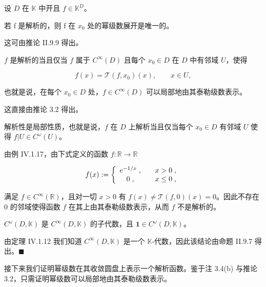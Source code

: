 \begin{remark}

设 $D$ 在 $\mathbb{K}$ 中开且 $f \in \mathbb{K}^D$。

\begin{items}
\item

若 f 是解析的，则 f 在 $x_0$ 处的幂级数展开是唯一的。

\proofhead
这可由推论 II.9.9 得出。
\item

$f$ 是解析的当且仅当 $f$ 属于 $C^\infty(D)$ 且每个 $x_0 \in D$ 在 $D$ 中有邻域 $U$，使得

\[
f(x)=\mathcal{T}(f,x_{0})(x),\qquad x\in U,
\]

也就是说，在每个 $ x_0 \in D $ 处，$ f \in C^\infty(D) $ 可以局部地由其泰勒级数表示。

\proofhead
这直接由推论 3.2 得出。
\item

解析性是局部性质，也就是说，$f$ 在 $D$ 上解析当且仅当每个 $x_0 \in D$ 有邻域 $U$ 使得 $f|U \in C^\omega(U)$。

\item

由例 IV.1.17，由下式定义的函数 $ f: \mathbb{R} \to \mathbb{R} $

\begin{equation*}
f(x):=\left\{\begin{array}{c l}{e^{-1/x}\;,}&{\quad x>0\;,}\\ {0\;,}&{\quad x\leq0\;,}\\ \end{array}\right.
\end{equation*}

满足 $ f \in C^\infty(\mathbb{R}) $，且对一切 $ x > 0 $ 有 $ f(x) \neq \mathcal{T}(f,0)(x) = 0 $。因此不存在 0 的邻域使得函数 $ f $ 在其上由其泰勒级数表示，从而 $ f $ 不是解析的。

\item

$ C^\omega(D,\mathbb{K}) $ 是 $ C^\infty(D,\mathbb{K}) $ 的子代数，且 $ \mathbf{1} \in C^\omega(D,\mathbb{K}) $。

\proofhead
由定理 IV.1.12 我们知道 $ C^\infty(D, \mathbb{K}) $ 是一个 $ \mathbb{K} $-代数，因此该结论由命题 II.9.7 得出。$ \blacksquare $
\end{items}

接下来我们证明幂级数在其收敛圆盘上表示一个解析函数。鉴于注 3.4(b) 与推论 3.2，只需证明幂级数可以局部地由其泰勒级数表示。

\end{remark}


